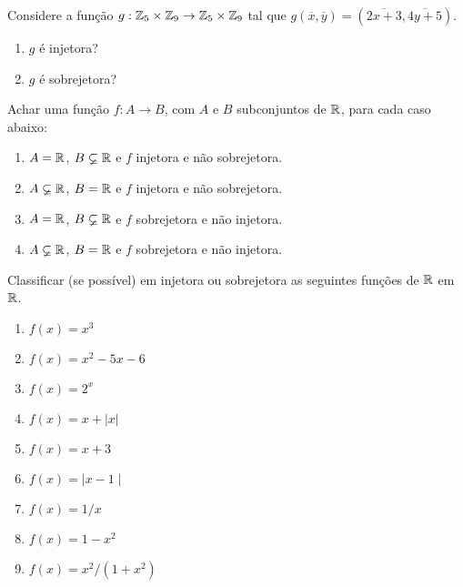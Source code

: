\documentclass[12pt]{exam}
\begin{document}
    \questao{} Considere a função $g : \mathbb{Z}_5 \times \mathbb{Z}_9 \to \mathbb{Z}_5 \times \mathbb{Z}_9$ tal que $g(\overline{x},\overline{y}) = (\overline{2x + 3}, \overline{4y + 5})$.
    \begin{enumerate}[label={\alph*})]
        \item $g$ é injetora?

        \item $g$ é sobrejetora?
    \end{enumerate}

    \vspace{.3cm}

    \questao{} Achar uma função $f : A \to B$, com $A$ e $B$ subconjuntos de $\mathbb{R}$, para cada caso abaixo:
    \begin{enumerate}[label={\alph*})]
        \item $A = \mathbb{R}$, $B \varsubsetneq \mathbb{R}$ e $f$ injetora e não sobrejetora.

        \item $A \varsubsetneq \mathbb{R}$, $B = \mathbb{R}$ e $f$ injetora e não sobrejetora.

        \item $A = \mathbb{R}$, $B \varsubsetneq \mathbb{R}$ e $f$ sobrejetora e não injetora.

        \item $A \varsubsetneq \mathbb{R}$, $B = \mathbb{R}$ e $f$ sobrejetora e não injetora.
    \end{enumerate}

    \vspace{.3cm}

    \questao{} Classificar (se possível) em injetora ou sobrejetora as seguintes funç{õ}es de $\mathbb{R}$ em $\mathbb{R}$.

    \begin{multicols}{2}
        \begin{enumerate}[label={\alph*})]
            \item $f(x) = x^3$

            \item $f(x) = x^2 - 5x - 6$

            \item $f(x) = 2^x$

            \item $f(x) = x + | x |$

            \item $f(x) = x + 3$

            \item $f(x) = \mid x - 1\mid$

            \item $f(x) = 1/x$

            \item $f(x) = 1 - x^2$

            \item $f(x) = x^2/(1 + x^2)$
        \end{enumerate}
    \end{multicols}
\end{document}
